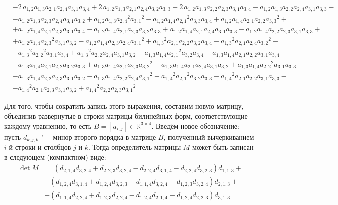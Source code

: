 \begin{equation}
\begin{aligned}
        &- 2\,a_{{1,2}}a_{{1,3}}a_{{2,1}}a_{{2,4}}a_{{3,1}}a_{{3,4}} + 2\,a_{{1,2}}a_{{1,3}}a_{{2,1}}a_{{2,4}}a_{{3,2}}a_{{3,3}} + 2\,a_{{1,2}}a_{{1,3}}a_{{2,2}}a_{{2,3}}a_{{3,1}}a_{{3,4}} - a_{{1,2}}a_{{1,3}}a_{{2,2}}a_{{2,4}}a_{{3,1}}a_{{3,3}} - \\
        &- a_{{1,2}}a_{{1,3}}a_{{2,3}}a_{{2,4}}a_{{3,1}}a_{{3,2}} + a_{{1,2}}a_{{1,3}}{a_{{2,4}}}^{2}{a_{{3,1}}}^{2} - a_{{1,2}}a_{{1,4}}{a_{{2,1}}}^{2}a_{{3,3}}a_{{3,4}} + a_{{1,2}}a_{{1,4}}a_{{2,1}}a_{{2,2}}{a_{{3,3}}}^{2} + \\ 
        &+ a_{{1,2}}a_{{1,4}}a_{{2,1}}a_{{2,3}}a_{{3,1}}a_{{3,4}} - a_{{1,2}}a_{{1,4}}a_{{2,1}}a_{{2,3}}a_{{3,2}}a_{{3,3}} + a_{{1,2}}a_{{1,4}}a_{{2,1}}a_{{2,4}}a_{{3,1}}a_{{3,3}} - a_{{1,2}}a_{{1,4}}a_{{2,2}}a_{{2,3}}a_{{3,1}}a_{{3,3}} + \\ 
        &+ a_{{1,2}}a_{{1,4}}{a_{{2,3}}}^{2}a_{{3,1}}a_{{3,2}} - a_{{1,2}}a_{{1,4}}a_{{2,3}}a_{{2,4}}{a_{{3,1}}}^{2} + {a_{{1,3}}}^{2}a_{{2,1}}a_{{2,2}}a_{{3,2}}a_{{3,4}} - {a_{{1,3}}}^{2}a_{{2,1}}a_{{2,4}}{a_{{3,2}}}^{2} -\\ 
        &- {a_{{1,3}}}^{2}{a_{{2,2}}}^{2}a_{{3,1}}a_{{3,4}} + {a_{{1,3}}}^{2}a_{{2,2}}a_{{2,4}}a_{{3,1}}a_{{3,2}} - a_{{1,3}}a_{{1,4}}{a_{{2,1}}}^{2}a_{{3,2}}a_{{3,4}} + a_{{1,3}}a_{{1,4}}a_{{2,1}}a_{{2,2}}a_{{3,1}}a_{{3,4}} - \\ 
        &- a_{{1,3}}a_{{1,4}}a_{{2,1}}a_{{2,2}}a_{{3,2}}a_{{3,3}} + a_{{1,3}}a_{{1,4}}a_{{2,1}}a_{{2,3}}{a_{{3,2}}}^{2} + a_{{1,3}}a_{{1,4}}a_{{2,1}}a_{{2,4}}a_{{3,1}}a_{{3,2}} + a_{{1,3}}a_{{1,4}}{a_{{2,2}}}^{2}a_{{3,1}}a_{{3,3}} - \\ 
        &- a_{{1,3}}a_{{1,4}}a_{{2,2}}a_{{2,3}}a_{{3,1}}a_{{3,2}} - a_{{1,3}}a_{{1,4}}a_{{2,2}}a_{{2,4}}{a_{{3,1}}}^{2} + {a_{{1,4}}}^{2}{a_{{2,1}}}^{2}a_{{3,2}}a_{{3,3}} - {a_{{1,4}}}^{2}a_{{2,1}}a_{{2,2}}a_{{3,1}}a_{{3,3}} - \\ 
        &- {a_{{1,4}}}^{2}a_{{2,1}}a_{{2,3}}a_{{3,1}}a_{{3,2}} + {a_{{1,4}}}^{2}a_{{2,2}}a_{{2,3}}{a_{{3,1}}}^{2}
\end{aligned}
\end{equation}

Для того, чтобы сократить запись этого выражения, составим новую матрицу, объединив развернутые в 
строки матрицы билинейных форм, соответствующие каждому уравнению, то есть $B = [a_{i, j}] \in 
\mathbb{R}^{3 \times 4}$. Введём новое обозначение: пусть $d_{k, j, k}$ "--- минор второго 
порядка в матрице $B$, полученный вычеркиванием $i$-й строки и столбцов $j$ и $k$. Тогда 
определитель матрицы $M$ может быть записан в следующем (компактном) виде: 
$$
	\begin{aligned}
	\det M & = (d_{2,1,4} d_{3,2,4} + d_{2,2,3} d_{3,2,4} - d_{2,2,4} d_{3,1,4} - 
		 	d_{2,2,4} d_{3,2,3}) d_{1,1,3} + \\
		 	& + (d_{1,2,4} d_{3,1,4} + d_{1,2,4} d_{3,2,3} - d_{1,1,4} d_{3,2,4} - d_{1,2,3}
		 	d_{3,2,4}) d_{2,1,3} + \\		 
		 	& + (d_{1,1,4} d_{2,2,4} + d_{1,2,3}d_{2,2,4} - d_{1,2,4}d_{2,1,4} - d_{1,2,4}
		 	d_{2,2,3}) d_{3,1,3}
	\end{aligned}
$$

